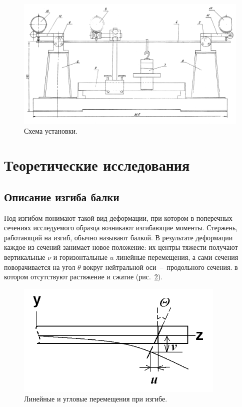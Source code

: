 \documentclass[12pt, a4paper]{article}
\begin{document}
    \begin{figure}[h]
        \centering
        \includegraphics[width = 16cm]{image_1.png}
        \caption{Схема установки.}
        \label{im1}
    \end{figure}
    
    \newpage
    
    \section{Теоретические исследования}
    
    \subsection{Описание изгиба балки}
    
    Под изгибом понимают такой вид деформации, при котором в поперечных сечениях исследуемого образца возникают изгибающие моменты. Стержень, работающий на изгиб, обычно называют балкой. В результате деформации каждое из сечений занимает новое положение: их центры тяжести получают вертикальные $\nu$ и горизонтальные $u$ линейные перемещения, а сами сечения поворачивается на угол $\theta$ вокруг нейтральной оси~--~продольного сечения. в котором отсутствуют растяжение и сжатие (рис.~\ref{im2}).
    
    \begin{figure}[h]
        \centering
        \includegraphics[width = 10cm]{image_2.png}
        \caption{Линейные и угловые перемещения при изгибе.}
        \label{im2}
    \end{figure}
    
\end{document}

